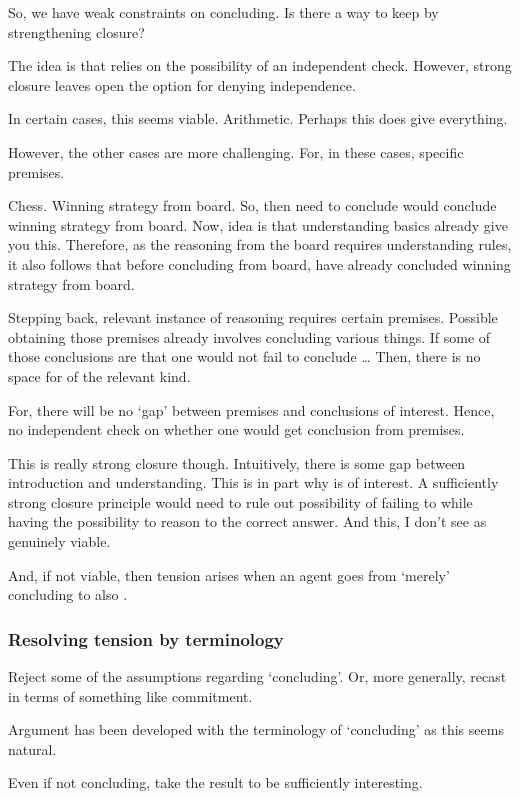\begin{note}
  So, we have weak constraints on concluding.
  Is there a way to keep \ESU{} by strengthening closure?

  The idea is that \csN{} relies on the possibility of an independent check.
  However, strong closure leaves open the option for denying independence.

  In certain cases, this seems viable.
  Arithmetic.
  Perhaps this does give everything.

  However, the other cases are more challenging.
  For, in these cases, specific premises.

  Chess.
  Winning strategy from board.
  So, then need to conclude would conclude winning strategy from board.
  Now, idea is that understanding basics already give you this.
  Therefore, as the reasoning from the board requires understanding rules, it also follows that before concluding from board, have already concluded winning strategy from board.

  Stepping back, relevant instance of reasoning requires certain premises.
  Possible obtaining those premises already involves concluding various things.
  If some of those conclusions are that one would not fail to conclude \dots
  Then, there is no space for  of the relevant kind.

  For, there will be no `gap' between premises and conclusions of interest.
  Hence, no independent check on whether one would get conclusion from premises.

  This is really strong closure though.
  Intuitively, there is some gap between introduction and understanding.
  This is in part why \csN{} is of interest.
  A sufficiently strong closure principle would need to rule out possibility of failing to \csN{} while having the possibility to reason to the correct answer.
  And this, I don't see as genuinely viable.

  And, if not viable, then tension arises when an agent goes from `merely' concluding to also \csN{}.
\end{note}

\subsubsection{Resolving tension by terminology}
\label{sec:resolv-tens-term}

\begin{note}[`Concluding']
  Reject some of the assumptions regarding `concluding'.
  Or, more generally, recast \csN{} in terms of something like commitment.

  Argument has been developed with the terminology of `concluding' as this seems natural.

  Even if not concluding, take the result to be sufficiently interesting.
\end{note}



